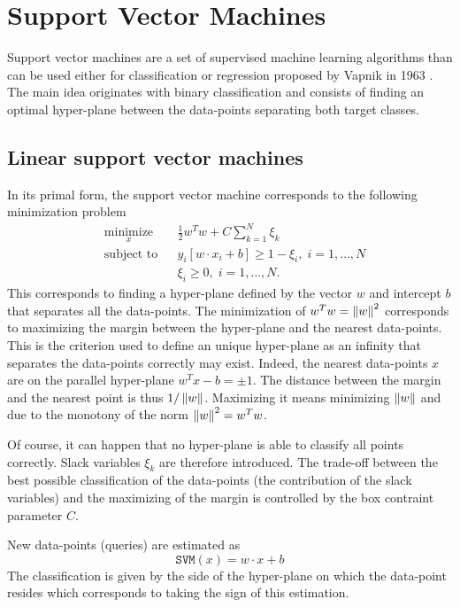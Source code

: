 \section{Support Vector Machines}
Support vector machines are a set of supervised machine learning algorithms than can be used either for classification or regression proposed by Vapnik in 1963 \cite{VapLer63}. The main idea originates with binary classification and consists of finding an optimal hyper-plane between the data-points separating both target classes.

\subsection{Linear support vector machines}
In its primal form, the support vector machine corresponds to the following minimization problem
\begin{equation}
    \begin{aligned}
& \underset{x}{\text{minimize}} 
& & \frac{1}{2}w^Tw + C \sum_{k=1}^N \xi_k \\
& \text{subject to}
& & y_i\left[ w \cdot x_i+b \right] \geq 1-\xi_i, \; i = 1, \ldots, N \\
& 
& & \xi_i \geq 0, \; i = 1, \ldots, N.
\end{aligned}
\end{equation}
This corresponds to finding a hyper-plane defined by the vector $w$ and intercept $b$ that separates all the data-points. The minimization of $w^Tw = \left\lVert w\right\rVert^2$ corresponds to maximizing the margin between the hyper-plane and the nearest data-points. This is the criterion used to define an unique hyper-plane as an infinity that separates the data-points correctly may exist. Indeed, the nearest data-points $x$ are on the parallel hyper-plane $w^Tx-b= \pm 1$. The distance between the margin and the nearest point is thus $1/\left\lVert w\right\rVert$. Maximizing it means minimizing $\left\lVert w\right\rVert$ and due to the monotony of the norm $\left\lVert w\right\rVert^2 = w^Tw$.

Of course, it can happen that no hyper-plane is able to classify all points correctly. Slack variables $\xi_k$ are therefore introduced. The trade-off between the best possible classification of the data-points (the contribution of the slack variables) and the maximizing of the margin is controlled by the box contraint parameter $C$.

New data-points (queries) are estimated as
\begin{equation}
    \mathtt{SVM}(x) = w \cdot x + b 
\end{equation}
The classification is given by the side of the hyper-plane on which the data-point resides which corresponds to taking the sign of this estimation.

